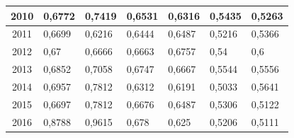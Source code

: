 \begin{table}[H]
\begin{tabular}{|c|l|l|l|l|l|l|}
		2010            & 0,6772                                                 & 0,7419                                                  & 0,6531                                                    & 0,6316                                                     & 0,5435                                                      & 0,5263                                                      \\ \hline
		2011            & 0,6699                                                 & 0,6216                                                  & 0,6444                                                    & 0,6487                                                     & 0,5216                                                      & 0,5366                                                      \\ \hline
		2012            & 0,67                                                   & 0,6666                                                  & 0,6663                                                    & 0,6757                                                     & 0,54                                                        & 0,6                                                         \\ \hline
		2013            & 0,6852                                                 & 0,7058                                                  & 0,6747                                                    & 0,6667                                                     & 0,5544                                                      & 0,5556                                                      \\ \hline
		2014            & 0,6957                                                 & 0,7812                                                  & 0,6312                                                    & 0,6191                                                     & 0,5033                                                      & 0,5641                                                      \\ \hline
		2015            & 0,6697                                                 & 0,7812                                                  & 0,6676                                                    & 0,6487                                                     & 0,5306                                                      & 0,5122                                                      \\ \hline
		2016            & 0,8788                                                 & 0,9615                                                  & 0,678                                                     & 0,625                                                      & 0,5206                                                      & 0,5111                                                      \\ \hline

\end{tabular}
\end{table}
